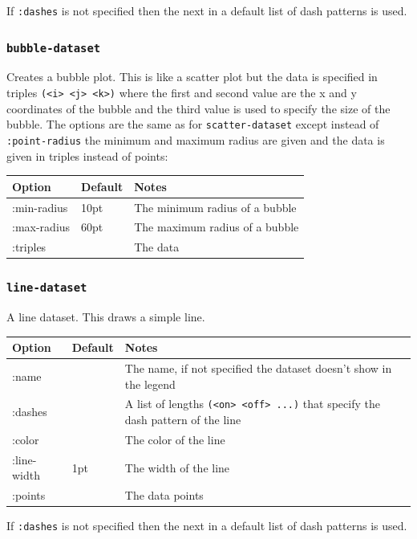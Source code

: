 \documentclass{article}
\begin{document}
If {\tt :dashes} is not specified then the next in a default list of
dash patterns is used.

\subsubsection{\tt bubble-dataset}

Creates a bubble plot.  This is like a scatter plot but the data is
specified in triples {\tt (<i> <j> <k>)} where the first and second
value are the x and y coordinates of the bubble and the third value is
used to specify the size of the bubble.  The options are the same as
for {\tt scatter-dataset} except instead of {\tt :point-radius} the
minimum and maximum radius are given and the data is given in triples
instead of points:

\begin{center}
\begin{tabular}{lll}
Option & Default & Notes \\
\hline
:min-radius & 10pt & The minimum radius of a bubble\\
:max-radius & 60pt & The maximum radius of a bubble\\
:triples & & The data\\
\end{tabular}
\end{center}

\subsubsection{\tt line-dataset}

A line dataset.  This draws a simple line.

\begin{center}
\begin{tabular}{lll}
Option & Default & Notes \\
\hline
:name & & The name, if not specified the dataset doesn't show in
the legend\\
:dashes & & A list of lengths {\tt (<on> <off> ...)} that specify the
dash pattern of the line\\
:color & & The color of the line\\
:line-width & 1pt & The width of the line\\
:points & & The data points\\
\end{tabular}
\end{center}

If {\tt :dashes} is not specified then the next in a default list of
dash patterns is used.
\end{document}
